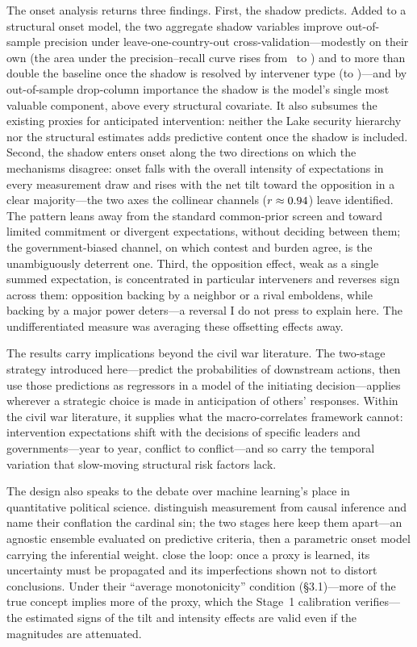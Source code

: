 The onset analysis returns three findings.  First, the shadow predicts.  Added
to a structural onset model, the two aggregate shadow variables improve
out-of-sample precision under leave-one-country-out cross-validation---modestly
on their own (the area under the precision--recall curve rises from
\OosBaseAucpr\ to \OosEntAucpr) and to more than double the baseline once the
shadow is resolved by intervener type (to \OosFullAucpr)---and by out-of-sample
drop-column
importance the shadow is the model's single most valuable component, above every
structural covariate.  It also subsumes the existing proxies for anticipated
intervention: neither the Lake security hierarchy \citep{cunningham2016} nor the
\citet{gibilisco2022} structural estimates adds predictive content once the
shadow is included.  Second, the shadow enters onset along the two directions on
which the mechanisms disagree: onset falls with the overall intensity of
expectations in every measurement draw and rises with the net tilt toward the
opposition in a clear majority---the two axes the collinear channels
($r \approx 0.94$) leave identified.  The pattern leans away from the standard
common-prior screen and toward limited commitment or divergent expectations,
without deciding between them; the government-biased channel, on which contest
and burden agree, is the unambiguously deterrent one.  Third, the opposition
effect, weak as a single summed expectation, is concentrated in particular
interveners and reverses sign across them: opposition backing by a neighbor or a
rival emboldens, while backing by a major power deters---a reversal I do not
press to explain here.  The undifferentiated measure was averaging these
offsetting effects away.

The results carry implications beyond the civil war literature.  The
two-stage strategy introduced here---predict the probabilities of downstream
actions, then use those predictions as regressors in a model of the
initiating decision---applies wherever a strategic choice is made in
anticipation of others' responses.  Within the civil war literature, it
supplies what the macro-correlates framework cannot: intervention
expectations shift with the decisions of specific leaders and
governments---year to year, conflict to conflict---and so carry the temporal
variation that slow-moving structural risk factors lack.

The design also speaks to the debate over machine learning's place in
quantitative political science.  \citet{grimmerrobertsstewart2021}
distinguish measurement from causal inference and name their conflation the
cardinal sin; the two stages here keep them apart---an agnostic ensemble
evaluated on predictive criteria, then a parametric onset model carrying the
inferential weight.  \citet{knoxlucascho2022} close the loop: once a proxy
is learned, its uncertainty must be propagated and its imperfections shown
not to distort conclusions.  Under their ``average monotonicity'' condition
(\S3.1)---more of the true concept implies more of the proxy, which the
Stage~1 calibration verifies---the estimated signs of the tilt and intensity
effects are valid even if the magnitudes are attenuated.

